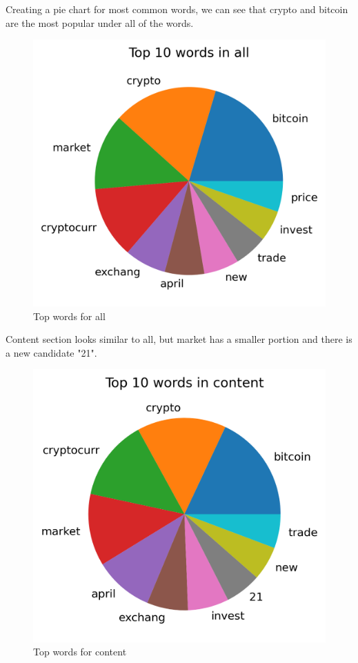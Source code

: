 Creating a pie chart for most common words, we can see that crypto and bitcoin are the most popular under all of the words.
\begin{figure}[H]
\includegraphics[scale=1]{img/B2/top_words_all.png}
\centering
\caption{Top words for all}
\label{fig:top_words_all}
\end{figure}

Content section looks similar to all, but market has a smaller portion and there is a new candidate "21". 
\begin{figure}[H]
\includegraphics[scale=1]{img/B2/top_words_content.png}
\centering
\caption{Top words for content}
\label{fig:top_words_content}
\end{figure}

